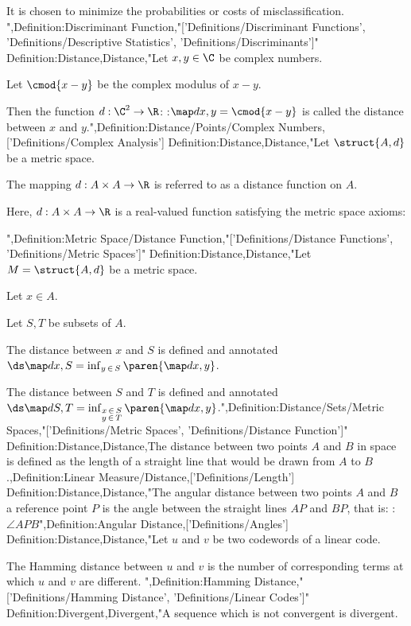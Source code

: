 It is chosen to minimize the probabilities or costs of misclassification.
",Definition:Discriminant Function,"['Definitions/Discriminant Functions', 'Definitions/Descriptive Statistics', 'Definitions/Discriminants']"
Definition:Distance,Distance,"Let $x, y \in \C$ be complex numbers.

Let $\cmod {x - y}$ be the complex modulus of $x - y$.


Then the function $d: \C^2 \to \R$:
:$\map d {x, y} = \cmod {x - y}$
is called the distance between $x$ and $y$.",Definition:Distance/Points/Complex Numbers,['Definitions/Complex Analysis']
Definition:Distance,Distance,"Let $\struct {A, d}$ be a metric space.

The mapping $d: A \times A \to \R$ is referred to as a distance function on $A$.


Here, $d: A \times A \to \R$ is a real-valued function satisfying the metric space axioms:

",Definition:Metric Space/Distance Function,"['Definitions/Distance Functions', 'Definitions/Metric Spaces']"
Definition:Distance,Distance,"Let $M = \struct {A, d}$ be a metric space.

Let $x \in A$.

Let $S, T$ be subsets of $A$.


The distance between $x$ and $S$ is defined and annotated $\ds \map d {x, S} = \inf_{y \mathop \in S} \paren {\map d {x, y} }$.

The distance between $S$ and $T$ is defined and annotated $\ds \map d {S, T} = \inf_{\substack {x \mathop \in S \\ y \mathop \in T} } \paren {\map d {x, y} }$.",Definition:Distance/Sets/Metric Spaces,"['Definitions/Metric Spaces', 'Definitions/Distance Function']"
Definition:Distance,Distance,The distance between two points $A$ and $B$ in space is defined as the length of a straight line that would be drawn from $A$ to $B$.,Definition:Linear Measure/Distance,['Definitions/Length']
Definition:Distance,Distance,"The angular distance between two points $A$ and $B$  a reference point $P$ is the angle between the straight lines $AP$ and $BP$, that is:
:$\angle APB$",Definition:Angular Distance,['Definitions/Angles']
Definition:Distance,Distance,"Let $u$ and $v$ be two codewords of a linear code.

The Hamming distance between $u$ and $v$ is the number of corresponding terms at which $u$ and $v$ are different.
",Definition:Hamming Distance,"['Definitions/Hamming Distance', 'Definitions/Linear Codes']"
Definition:Divergent,Divergent,"A sequence which is not convergent is divergent.



